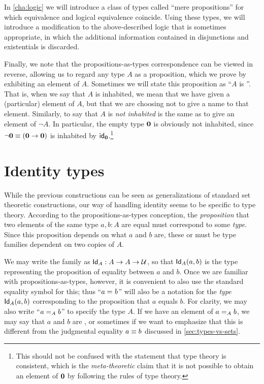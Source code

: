 In \cref{cha:logic} we will introduce a class of types called ``mere propositions'' for which equivalence and logical equivalence coincide.
Using these types, we will introduce a modification to the above-described logic that is sometimes appropriate, in which the additional information contained in disjunctions and existentials is discarded.

Finally, we note that the propositions-as-types correspondence can be viewed in reverse, allowing us to regard any type $A$ as a proposition, which we prove by exhibiting an element of $A$.
Sometimes we will state this proposition as ``$A$ is ''.
%
%
That is, when we say that $A$ is inhabited, we mean that we have given a (particular) element of $A$, but that we are choosing not to give a name to that element.
Similarly, to say that $A$ is \emph{not inhabited} is the same as to give an element of $\neg A$.
In particular, the empty type $\emptyt$ is obviously not inhabited, since $\neg \emptyt \jdeq (\emptyt \to \emptyt)$ is inhabited by $\idfunc[\emptyt]$.\footnote{This should not be confused with the statement that type theory is consistent, which is the \emph{meta-theoretic} claim that it is not possible to obtain an element of $\emptyt$ by following the rules of type theory.}

%
%
%

\section{Identity types}
\label{sec:identity-types}

%
%
%
%
While the previous constructions can be seen as generalizations of
standard set theoretic constructions, our way of handling identity  seems to be
specific to type theory.
According to the propositions-as-types conception, the \emph{proposition} that two elements of the same type $a,b:A$ are equal must correspond to some \emph{type}.
Since this proposition depends on what $a$ and $b$ are, these  or  must be type families dependent on two copies of $A$.

We may write the family as $\idtypevar{A}:A\to A\to\type$, so that $\idtype[A]ab$ is the type representing the proposition of equality between $a$ and $b$.
Once we are familiar with propositions-as-types, however, it is convenient to also use the standard equality symbol for this; thus ``$\id{a}{b}$'' will also be a notation for the \emph{type} $\idtype[A]ab$ corresponding to the proposition that $a$ equals $b$.
For clarity, we may also write ``$\id[A]{a}{b}$'' to specify the type $A$.
If we have an element of $\id[A]{a}{b}$, we may say that $a$ and $b$ are , or sometimes  if we want to emphasize that this is different from the judgmental equality $a\jdeq b$ discussed in \cref{sec:types-vs-sets}.
%
%

